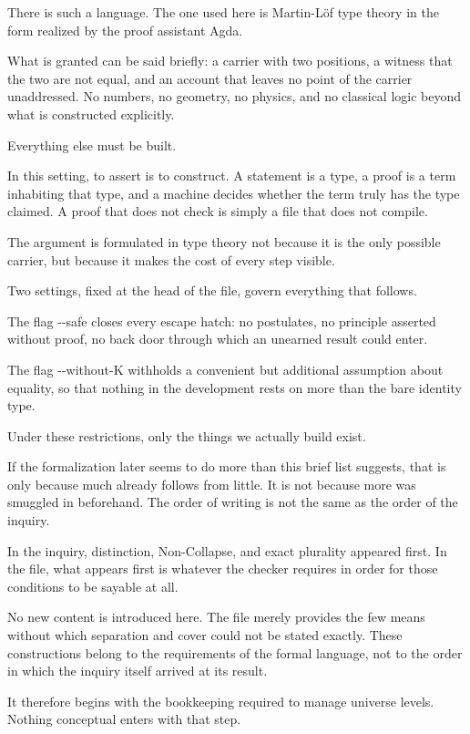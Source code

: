 \documentclass[11pt,a4paper]{book}
\newcommand{\AgdaFlag}[1]{\texttt{-{}-#1}}
\def\texttt#1{#1}%
\begin{document}
There is such a language. The one used here is Martin-L\"of type theory in
the form realized by the proof assistant Agda.

What is granted can be said briefly: a carrier with two positions, a
witness that the two are not equal, and an account that leaves no point of
the carrier unaddressed. No numbers, no geometry, no physics, and no
classical logic beyond what is constructed explicitly.

Everything else must be built.

In this setting, to assert is to construct. A statement is a type, a proof
is a term inhabiting that type, and a machine decides whether the term
truly has the type claimed. A proof that does not check is simply a file
that does not compile.

The argument is formulated in type theory not because it is the only
possible carrier, but because it makes the cost of every step visible.

Two settings, fixed at the head of the file, govern everything that
follows.

The flag \AgdaFlag{safe} closes every escape hatch: no postulates, no
principle asserted without proof, no back door through which an unearned
result could enter.

The flag \AgdaFlag{without-K} withholds a convenient but additional
assumption about equality, so that nothing in the development rests on more
than the bare identity type.

Under these restrictions, only the things we actually build exist.

If the formalization later seems to do more than this brief list suggests,
that is only because much already follows from little. It is not because
more was smuggled in beforehand. The order of writing is not the same as 
the order of the inquiry.

In the inquiry, distinction, Non-Collapse, and exact plurality appeared
first. In the file, what appears first is whatever the checker requires in
order for those conditions to be sayable at all.

No new content is introduced here. The file merely provides the few means
without which separation and cover could not be stated exactly. These 
constructions belong to the requirements of the formal language, not
to the order in which the inquiry itself arrived at its result.

It therefore begins with the bookkeeping required to manage universe
levels. Nothing conceptual enters with that step.
\end{document}
